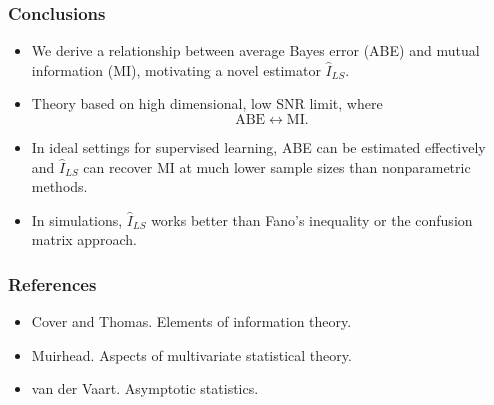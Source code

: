 \documentclass{beamer}
\begin{document}
\begin{frame}
\frametitle{Conclusions}
\begin{itemize}
\item We derive a relationship between average Bayes error (ABE) and mutual
  information (MI), motivating a novel estimator $\hat{I}_{LS}$.
\item Theory based on high dimensional, low SNR limit,
where \[\text{ABE} \leftrightarrow \text{MI}.\]
\item In ideal settings for supervised learning, ABE can be estimated
  effectively and $\hat{I}_{LS}$ can recover MI at much lower sample
  sizes than nonparametric methods.
\item In simulations, $\hat{I}_{LS}$ works better than Fano's
  inequality or the confusion matrix approach.
\end{itemize}
\end{frame}

\begin{frame}
\frametitle{References}
\begin{itemize}
\item Cover and Thomas.  Elements of information theory.
\item Muirhead.  Aspects of multivariate statistical theory.
\item van der Vaart.  Asymptotic statistics.
\end{itemize}
\end{frame}
\end{document}
